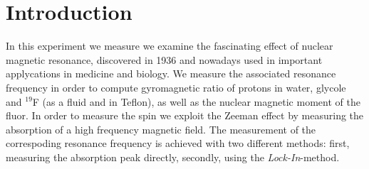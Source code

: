 \section{Introduction}

In this experiment we measure we examine the fascinating effect of nuclear 
magnetic resonance, discovered in 1936 and nowadays used in important applycations 
in medicine and biology. 
We measure the associated resonance frequency in order to compute 
gyromagnetic ratio of protons in water, glycole and $^19$F
(as a fluid and in Teflon), as well as the nuclear magnetic moment of the fluor. 
In order to measure the spin we exploit the Zeeman effect
by measuring the absorption of a high frequency magnetic field. 
The measurement of the correspoding resonance frequency is achieved 
with two different methods: first, measuring the absorption peak directly, 
secondly, using the \emph{Lock-In}-method. 

